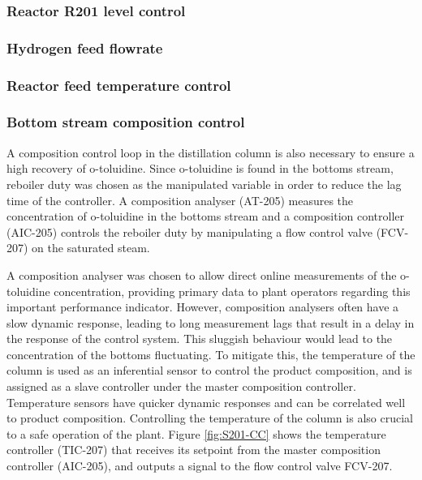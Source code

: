\subsubsection{Reactor R201 level control} %


\subsubsection{Hydrogen feed flowrate} %








\subsubsection{Reactor feed temperature control}%

\subsubsection{Bottom stream composition control} %
A composition control loop in the distillation column is also necessary to ensure a high recovery of o-toluidine. Since o-toluidine is found in the bottoms stream, reboiler duty was chosen as the manipulated variable in order to reduce the lag time of the controller. A composition analyser (AT-205) measures the concentration of o-toluidine in the bottoms stream and a composition controller (AIC-205) controls the reboiler duty by manipulating a flow control valve (FCV-207) on the saturated steam. 

A composition analyser was chosen to allow direct online measurements of the o-toluidine concentration, providing primary data to plant operators regarding this important performance indicator. However, composition analysers often have a slow dynamic response, leading to long measurement lags that result in a delay in the response of the control system. This sluggish behaviour would lead to the concentration of the bottoms fluctuating. To mitigate this, the temperature of the column is used as an inferential sensor to control the product composition, and is assigned as a slave controller under the master composition controller. Temperature sensors have quicker dynamic responses and can be correlated well to product composition. Controlling the temperature of the column is also crucial to a safe operation of the plant. Figure \ref{fig:S201-CC} shows the temperature controller (TIC-207) that receives its setpoint from the master composition controller (AIC-205), and outputs a signal to the flow control valve FCV-207.

